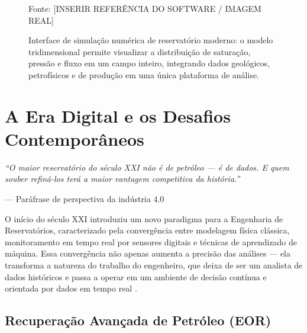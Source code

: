 \documentclass[
  12pt,
  a4paper,
  oneside,
  brazilian,
  sumario=tradicional
]{abntex2}
\renewcommand{\fonte}[1]{\vspace{2pt}\par\noindent\footnotesize Fonte: #1}
\begin{document}
\begin{figure}[H]
  \centering
  \caption{Interface de simulação numérica de reservatório moderno: o modelo tridimensional permite visualizar a distribuição de saturação, pressão e fluxo em um campo inteiro, integrando dados geológicos, petrofísicos e de produção em uma única plataforma de análise.}
  \label{fig:simulador}
  \fonte{[INSERIR REFERÊNCIA DO SOFTWARE / IMAGEM REAL]}
\end{figure}

\section{A Era Digital e os Desafios Contemporâneos}
\label{sec:digital}

\epigraph{\textit{``O maior reservatório do século XXI não é de petróleo
— é de dados. E quem souber refiná-los terá a maior vantagem
competitiva da história.''}}{--- Paráfrase de perspectiva da
indústria 4.0}

O início do século XXI introduziu um novo paradigma para a Engenharia
de Reservatórios, caracterizado pela convergência entre modelagem
física clássica, monitoramento em tempo real por sensores digitais e
técnicas de aprendizado de máquina. Essa convergência não apenas
aumenta a precisão das análises — ela transforma a natureza do trabalho
do engenheiro, que deixa de ser um analista de dados históricos e passa
a operar em um ambiente de decisão contínua e orientada por dados em
tempo real \cite{ramos2020, ahmed2010}.

\subsection{Recuperação Avançada de Petróleo (EOR)}
\end{document}
